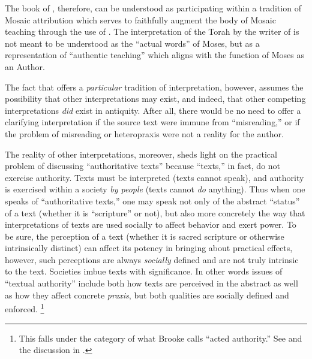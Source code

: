 The book of \jub, therefore, can be understood as participating within a tradition of Mosaic attribution which serves to faithfully augment the body of Mosaic teaching through the use of \psy. The interpretation of the Torah by the writer of \jub is not meant to be understood as the ``actual words'' of Moses, but as a representation of ``authentic teaching'' which aligns with the function of Moses as an Author.\autocite[13]{najman2003}

The fact that \jub offers a \emph{particular} tradition of interpretation, however, assumes the possibility that other interpretations may exist, and indeed, that other competing interpretations \emph{did} exist in antiquity. After all, there would be no need to offer a clarifying interpretation if the source text were immune from ``misreading,'' or if the problem of misreading or heteropraxis were not a reality for the author. 

The reality of other interpretations, moreover, sheds light on the practical problem of discussing ``authoritative texts'' because ``texts,'' in fact, do not exercise authority. Texts must be interpreted (texts cannot speak), and authority is exercised within a society \emph{by people} (texts cannot \emph{do} anything). Thus when one speaks of ``authoritative texts,'' one may speak not only of the abstract ``status'' of a text (whether it is ``scripture'' or not), but also more concretely the way that interpretations of texts are used socially to affect behavior and exert power.\autocite{foucault_ci1982} To be sure, the perception of a text (whether it is sacred scripture or otherwise intrinsically distinct) can affect its potency in bringing about practical effects, however, such perceptions are always \emph{socially} defined and are not truly intrinsic to the text. Societies imbue texts with significance. In other words issues of ``textual authority'' include both how texts are perceived in the abstract as well as how they affect concrete \emph{praxis}, but both qualities are socially defined and enforced.%
    \footnote{This falls under the category of what Brooke calls ``acted authority.'' See
        \cite[519--523]{brooke_rev-qumran2012} and the discussion in 
        \cite[475]{debel_jsj2014}.}

